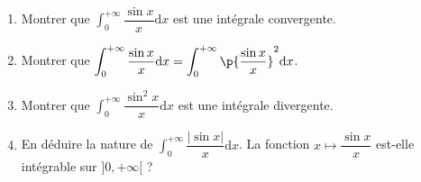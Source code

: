 \begin{enumerate}
\item Montrer que $\displaystyle\int_0^{+\infty} \dfrac{\sin x}{x} \mathrm{d} x$ est une intégrale convergente.
\item Montrer que $\displaystyle\int_0^{+\infty} \dfrac{\sin x}{x} \mathrm{d} x=\displaystyle\int_0^{+\infty} \p{\dfrac{\sin x}{x}}^2 \mathrm{d} x$.
\item Montrer que $\displaystyle\int_0^{+\infty} \dfrac{\sin ^2 x}{x} \mathrm{d} x$ est une intégrale divergente.
\item En déduire la nature de $\displaystyle\int_0^{+\infty} \dfrac{|\sin x|}{x} \mathrm{d} x$. La fonction $x \mapsto \dfrac{\sin x}{x}$ est-elle intégrable sur $] 0,+\infty[$ ?                                                                                                                \end{enumerate}
